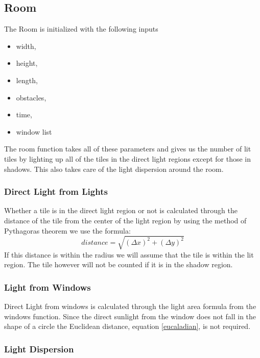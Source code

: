 \documentclass[conference]{IEEEtran}
\begin{document}
\subsection{Room}
The Room is initialized with the following inputs 
\begin{itemize}
    \item width,
    \item height, 
    \item length, 
    \item obstacles, 
    \item time,
    \item window list
\end{itemize}
The room function takes all of these parameters and gives us the number of lit tiles by lighting up all of the tiles in the direct light regions except for those in shadows. This also takes care of the light dispersion around the room. \\

\subsubsection{Direct Light from Lights}
Whether a tile is in the direct light region or not is calculated through the distance of the tile from the center of the light region by using the method of Pythagoras theorem we use the formula:
\begin{equation}
    distance = \sqrt{(\Delta x)^{2} + (\Delta y)^{2} }
    \label{eucaladian}
\end{equation}
If this distance is within the radius we will assume that the tile is within the lit region. The tile however will not be counted if it is in the shadow region. \\

\subsubsection{Light from Windows}
Direct Light from windows is calculated through the light area formula from the windows function. Since the direct sunlight from the window does not fall in the shape of a circle the Euclidean distance, equation \ref{eucaladian}, is not required. \\

\subsubsection{Light Dispersion}
\end{document}

